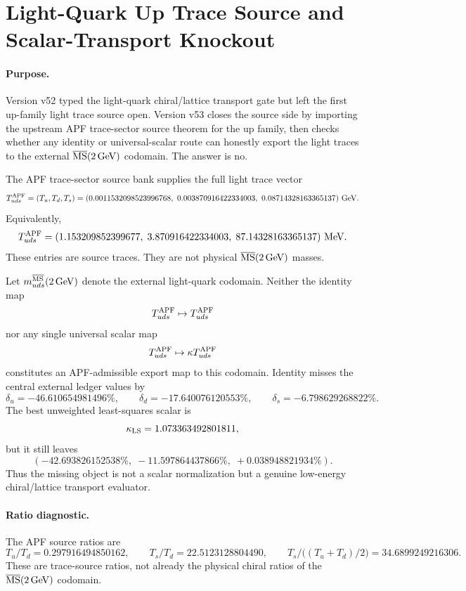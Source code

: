 \section{Light-Quark Up Trace Source and Scalar-Transport Knockout}
\label{sec:light-quark-source-scalar-v53}

\paragraph{Purpose.}
Version v52 typed the light-quark chiral/lattice transport gate but left the
first up-family light trace source open.  Version v53 closes the source side by
importing the upstream APF trace-sector source theorem for the up family, then
checks whether any identity or universal-scalar route can honestly export the
light traces to the external
\(\overline{\rm MS}(2\,{\rm GeV})\) codomain.  The answer is no.

\begin{theorem}
The APF trace-sector source bank supplies the full light trace vector
\[
T_{uds}^{\rm APF}
= (T_u,T_d,T_s)
= (0.0011532098523996768,\
   0.003870916422334003,\
   0.08714328163365137)\ {\rm GeV}.
\]
Equivalently,
\[
T_{uds}^{\rm APF}
= (1.153209852399677,\;3.870916422334003,\;87.14328163365137)\ {\rm MeV}.
\]
These entries are source traces.  They are not physical
\(\overline{\rm MS}(2\,{\rm GeV})\) masses.
\end{theorem}

\begin{theorem}
Let \(m_{uds}^{\overline{\rm MS}}(2\,{\rm GeV})\) denote the external light-quark
codomain.  Neither the identity map
\[
T_{uds}^{\rm APF}\mapsto T_{uds}^{\rm APF}
\]
nor any single universal scalar map
\[
T_{uds}^{\rm APF}\mapsto \kappa T_{uds}^{\rm APF}
\]
constitutes an APF-admissible export map to this codomain.  Identity misses the
central external ledger values by
\[
\delta_u=-46.610654981496\%,\qquad
\delta_d=-17.640076120553\%,\qquad
\delta_s=-6.798629268822\%.
\]
The best unweighted least-squares scalar is
\[
\kappa_{\rm LS}=1.073363492801811,
\]
but it still leaves
\[
(-42.693826152538\%,\;-11.597864437866\%,\;+0.038948821934\%).
\]
Thus the missing object is not a scalar normalization but a genuine low-energy
chiral/lattice transport evaluator.
\end{theorem}

\paragraph{Ratio diagnostic.}
The APF source ratios are
\[
T_u/T_d=0.297916494850162,
\qquad
T_s/T_d=22.5123128804490,
\qquad
T_s/\bigl((T_u+T_d)/2\bigr)=34.6899249216306.
\]
These are trace-source ratios, not already the physical chiral ratios of the
\(\overline{\rm MS}(2\,{\rm GeV})\) codomain.

